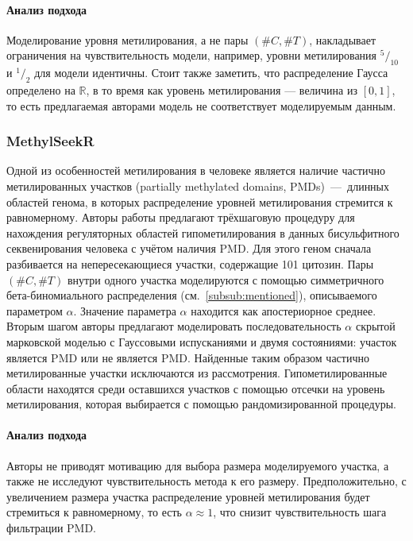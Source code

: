 \paragraph{Анализ подхода}

Моделирование уровня метилирования, а не пары $(\#C, \#T)$, накладывает ограничения на
чувствительность модели, например, уровни метилирования $^5/_{10}$ и $^1/_2$ для модели
идентичны. Стоит также заметить, что распределение Гаусса определено на $\mathbb{R}$,
в то время как уровень метилирования --- величина из $[0, 1]$, то есть предлагаемая
авторами модель не соответствует моделируемым данным.

\subsubsection{MethylSeekR}

Одной из особенностей \cite{lister2009human,gaidatzis2014} метилирования в человеке является наличие
частично метилированных участков (partially methylated domains, PMDs)~---~длинных областей генома, в
которых распределение уровней метилирования стремится к равномерному. Авторы работы
\cite{Burger2013} предлагают трёхшаговую процедуру для нахождения регуляторных областей
гипометилирования в данных бисульфитного секвенирования человека с учётом наличия PMD.
Для этого геном сначала разбивается на непересекающиеся участки, содержащие 101
цитозин. Пары $(\#C, \#T)$ внутри одного участка моделируются с помощью симметричного
бета-биномиального распределения (см.~\ref{subsub:mentioned}), описываемого параметром
$\alpha$. Значение параметра $\alpha$ находится как апостериорное среднее. Вторым шагом
авторы предлагают моделировать последовательность $\alpha$ скрытой марковской моделью с
Гауссовыми испусканиями и двумя состояниями: участок является PMD или не является PMD.
Найденные таким образом частично метилированные участки исключаются из рассмотрения.
Гипометилированные области находятся среди оставшихся участков с помощью отсечки на уровень
метилирования, которая выбирается с помощью рандомизированной процедуры.

\paragraph{Анализ подхода}

Авторы не приводят мотивацию для выбора размера моделируемого участка, а также не
исследуют чувствительность метода к его размеру. Предположительно, с увеличением
размера участка распределение уровней метилирования будет стремиться к равномерному,
то есть $\alpha \approx 1$, что снизит чувствительность шага фильтрации PMD.

